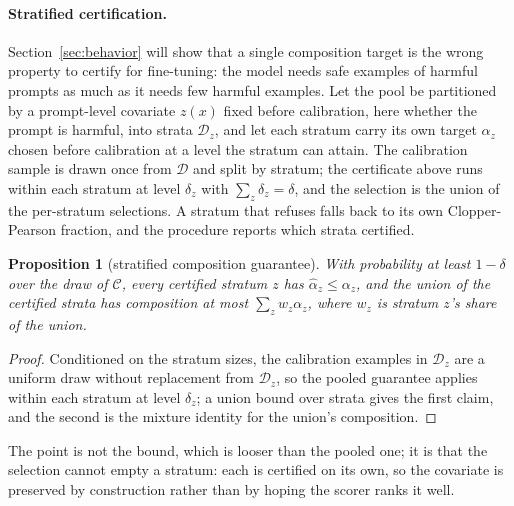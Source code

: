 \documentclass{article} %
\newtheorem{proposition}{Proposition}
\newcommand{\pool}{\mathcal{D}}
\newcommand{\calset}{\mathcal{C}}
\newcommand{\ahat}{\hat\alpha}
\begin{document}
\paragraph{Stratified certification.}
\label{sec:method-strat}
Section~\ref{sec:behavior} will show that a single composition target is the wrong property to certify for fine-tuning: the model needs safe examples of harmful prompts as much as it needs few harmful examples. Let the pool be partitioned by a prompt-level covariate $z(x)$ fixed before calibration, here whether the prompt is harmful, into strata $\pool_z$, and let each stratum carry its own target $\alpha_z$ chosen before calibration at a level the stratum can attain. The calibration sample is drawn once from $\pool$ and split by stratum; the certificate above runs within each stratum at level $\delta_z$ with $\sum_z \delta_z = \delta$, and the selection is the union of the per-stratum selections. A stratum that refuses falls back to its own Clopper-Pearson fraction, and the procedure reports which strata certified.
\begin{proposition}[stratified composition guarantee]
\label{prop:strat}
With probability at least $1 - \delta$ over the draw of $\calset$, every certified stratum $z$ has $\ahat_z \le \alpha_z$, and the union of the certified strata has composition at most $\sum_z w_z \alpha_z$, where $w_z$ is stratum $z$'s share of the union.
\end{proposition}
\begin{proof}
Conditioned on the stratum sizes, the calibration examples in $\pool_z$ are a uniform draw without replacement from $\pool_z$, so the pooled guarantee applies within each stratum at level $\delta_z$; a union bound over strata gives the first claim, and the second is the mixture identity for the union's composition.
\end{proof}
The point is not the bound, which is looser than the pooled one; it is that the selection cannot empty a stratum: each is certified on its own, so the covariate is preserved by construction rather than by hoping the scorer ranks it well.
\end{document}
